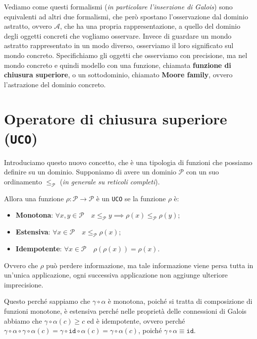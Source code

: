 Vediamo come questi formalismi (\textit{in particolare l'inserzione di
Galois}) sono equivalenti ad altri due formalismi, che però spostano 
l'osservazione dal dominio astratto, ovvero $\mathcal{A}$,
che ha una propria rappresentazione, a quello del dominio degli oggetti 
concreti che vogliamo osservare. Invece di guardare un mondo astratto 
rappresentato in un modo diverso, osserviamo il loro significato sul 
mondo concreto. Specifichiamo gli oggetti che osserviamo con precisione, ma 
nel mondo concreto e quindi modello con una funzione, chiamata \textbf{
funzione di chiusura superiore}, o un sottodominio, chiamato 
\textbf{Moore family}, ovvero l'astrazione del dominio concreto.

\section{Operatore di chiusura superiore (\texttt{UCO})}
Introduciamo questo nuovo concetto, che è una tipologia di funzioni che possiamo 
definire su un dominio. Supponiamo di avere un dominio $\mathcal{P}$ con un suo 
ordinamento $\leq_\mathcal{P}$ (\textit{in generale su reticoli completi}).

Allora una funzione $\rho : \mathcal{P} \to \mathcal{P}$ è un \texttt{UCO} 
se la funzione $\rho$ è:
\begin{itemize}
    \item \textbf{Monotona}: $\forall x,y \in \mathcal{P} \quad x \leq_\mathcal{P} y \implies \rho(x) \leq_\mathcal{P} \rho(y)$;
    \item \textbf{Estensiva}: $\forall x \in \mathcal{P} \quad x \leq_\mathcal{P} \rho(x)$;
    \item \textbf{Idempotente}: $\forall x \in \mathcal{P} \quad \rho(\rho(x)) = \rho(x)$.
\end{itemize}
Ovvero che $\rho$ può perdere informazione, ma tale informazione viene persa 
tutta in un'unica applicazione, ogni successiva applicazione non aggiunge
ulteriore imprecisione.

\begin{tcolorbox}[title = $\gamma \circ \alpha$ è un \texttt{UCO} nelle connessioni di Galois]
Questo perché sappiamo che $\gamma \circ \alpha$ è monotona, poiché 
si tratta di composizione di funzioni monotone, è estensiva perché
nelle proprietà delle connessioni di Galois abbiamo che 
$\gamma \circ \alpha(c) \geq c$ ed è idempotente, ovvero
perché $\gamma \circ \alpha \circ \gamma \circ \alpha(c) = 
\gamma \circ \texttt{id} \circ \alpha(c) = \gamma \circ \alpha(c)$, poiché 
$\gamma \circ \alpha \equiv \texttt{id}$.  
\end{tcolorbox}
